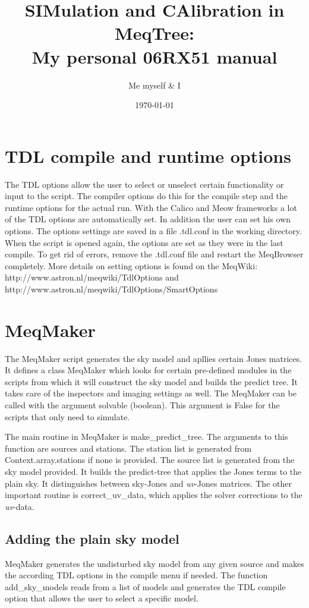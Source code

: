 \documentclass[11pt]{article}
\title{SIMulation and CAlibration in MeqTree:\\ My personal 06RX51 manual}
\author{Me myself \& I}
\date{\today}                                           %
\begin{document}
\maketitle

\section{TDL compile and runtime options}\label{options}
The TDL options allow the user to select or unselect certain functionality or input to the script. The compiler options do this for the compile step and the runtime options for the actual run. With the Calico and Meow frameworks a lot of the TDL options are automatically set. In addition the user can set his own options. The options settings are saved in a file .tdl.conf in the working directory. When the script is opened again, the options are set as they were in the last compile. To get rid of errors, remove the .tdl.conf file and restart the MeqBrowser completely. More details on setting options is found on the MeqWiki:
http://www.astron.nl/meqwiki/TdlOptions and http://www.astron.nl/meqwiki/TdlOptions/SmartOptions

\section{MeqMaker}\label{meqmaker}
The MeqMaker script generates the sky model and apllies certain Jones matrices. It defines a class MeqMaker which looks for certain pre-defined modules in the scripts from which it will construct the sky model and builds the predict tree. It takes care of the inspectors and imaging settings as well. The MeqMaker can be called with the argument solvable (boolean). This argument is False for the scripts that only need to simulate.

The main routine in MeqMaker is make\_predict\_tree. The arguments to this function are sources and stations. The station list is generated from Context.array.stations if none is provided. The source list is generated from the sky model provided. It builds the predict-tree that applies the Jones terms to the plain sky. It distinguishes between sky-Jones and {\it uv}-Jones matrices. The other important routine is correct\_uv\_data, which applies the solver corrections to the {\it uv}-data.

\subsection{Adding the plain sky model}\label{sources}
MeqMaker generates the undisturbed sky model from any given source and makes the according TDL options in the compile menu if needed. The function add\_sky\_models reads from a list of models and generates the TDL compile option that allows the user to select a specific model.
\end{document}
